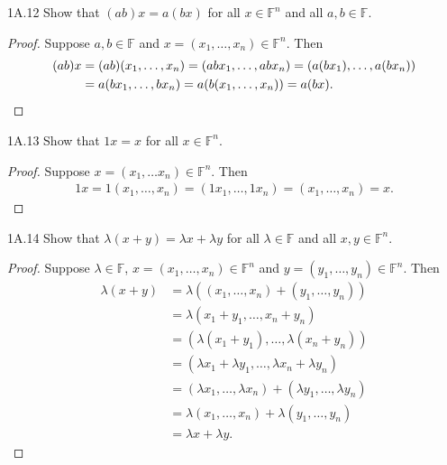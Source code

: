 \documentclass{exam}
\begin{document}
\begin{problem}{1A.12}
    Show that $(ab)x = a(bx)$ for all $x\in\mathbb F^n$ and all $a,b\in\mathbb F$.
\end{problem}

\begin{proof}
    Suppose $a,b\in\mathbb F$ and $x=(x_1,\dots,x_n)\in\mathbb F^n$. Then
    \begin{align*}
        (ab)x &= (ab)(x_1,\dots,x_n)=(abx_1,\dots,abx_n)=(a(bx_1),\dots,a(bx_n))\\
        &=a(bx_1,\dots,bx_n)=a(b(x_1,\dots,x_n))=a(bx).\qedhere
    \end{align*}
\end{proof}

\begin{problem}{1A.13}
    Show that $1x = x$ for all $x\in\mathbb F^n$.
\end{problem}

\begin{proof}
    Suppose $x = (x_1,\dots x_n)\in\mathbb F^n$. Then
    \begin{align*}
        1x =1(x_1,\dots, x_n) = (1x_1,\dots,1x_n)=(x_1,\dots,x_n) = x.
    \end{align*}
\end{proof}

\begin{problem}{1A.14}
    Show that $\lambda(x+y)=\lambda x+\lambda y$ for all $\lambda \in\mathbb F$ and all $x,y\in\mathbb F^n$.
\end{problem}

\begin{proof}
    Suppose $\lambda\in\mathbb F$, $x=(x_1,\dots,x_n)\in\mathbb F^n$ and $y=(y_1,\dots,y_n)\in\mathbb F^n$. Then
    \begin{align*}
        \lambda(x+y) &= \lambda((x_1,\dots,x_n) + (y_1,\dots,y_n))\\
        &=\lambda(x_1+y_1,\dots,x_n+y_n)\\
        &=(\lambda(x_1 + y_1),\dots,\lambda(x_n + y_n))\\
        &=(\lambda x_1 + \lambda y_1,\dots,\lambda x_n + \lambda y_n)\\
        &=(\lambda x_1,\dots,\lambda x_n) + (\lambda y_1,\dots,\lambda y_n)\\
        &=\lambda(x_1,\dots,x_n) + \lambda(y_1,\dots,y_n)\\
        &=\lambda x +\lambda y.
    \end{align*}
\end{proof}
\end{document}
